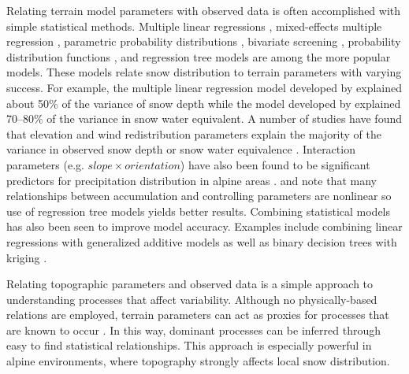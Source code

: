 \documentclass{sfuthesis}
\begin{document}
Relating terrain model parameters with observed data is often accomplished with simple statistical methods. Multiple linear regressions \citep{Marchand2005, Sold2013, McGrath2015}, mixed-effects multiple regression \citep{Kasurak2011}, parametric probability distributions \citep{Clark2011}, bivariate screening \citep{Anderton2004}, probability distribution functions \citep{Kerr2013}, and regression tree models \citep{Elder1998, Winstral2002, Molotch2005, Revuelto2014, Wetlaufer2016} are among the more popular models. These models relate snow distribution to terrain parameters with varying success. For example, the multiple linear regression model developed by \cite{Sold2013} explained about 50$\%$ of the variance of snow depth while the model developed by \cite{Anderton2004} explained 70--80$\%$ of the variance in snow water equivalent. A number of studies have found that elevation and wind redistribution parameters explain the majority of the variance in observed snow depth or snow water equivalence \citep[e.g.][]{Erickson2005, Trujillo2009,Schirmer2011, Grunewald2014, McGrath2015}. Interaction parameters (e.g. $slope \times orientation$) have also been found to be significant predictors for precipitation distribution in alpine areas \citep{Basist1994}. \cite{Erxleben2002} and \cite{Molotch2005} note that many relationships between accumulation and controlling parameters are nonlinear so use of regression tree models yields better results. Combining statistical models has also been seen to improve model accuracy. Examples include combining linear regressions with generalized additive models \citep{Lopez2006} as well as binary decision trees with kriging \citep{Balk2000}. 

Relating topographic parameters and observed data is a simple approach to understanding processes that affect variability. Although no physically-based relations are employed, terrain parameters can act as proxies for processes that are known to occur \citep{McGrath2015}. In this way, dominant processes can be inferred through easy to find statistical relationships. This approach is especially powerful in alpine environments, where topography strongly affects local snow distribution. 
\end{document}
